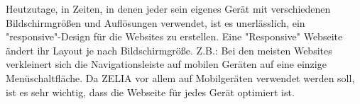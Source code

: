 
Heutzutage, in Zeiten, in denen jeder sein eigenes Gerät mit verschiedenen Bildschirmgrößen und Auflösungen verwendet, ist es unerlässlich, ein "responsive"-Design für die Websites zu erstellen. Eine "Responsive" Webseite ändert ihr Layout je nach Bildschirmgröße. Z.B.: Bei den meisten Websites verkleinert sich die Navigationsleiste auf mobilen Geräten auf eine einzige Menüschaltfläche. Da ZELIA vor allem auf Mobilgeräten verwendet werden soll, ist es sehr wichtig, dass die Webseite für jedes Gerät optimiert ist. 

